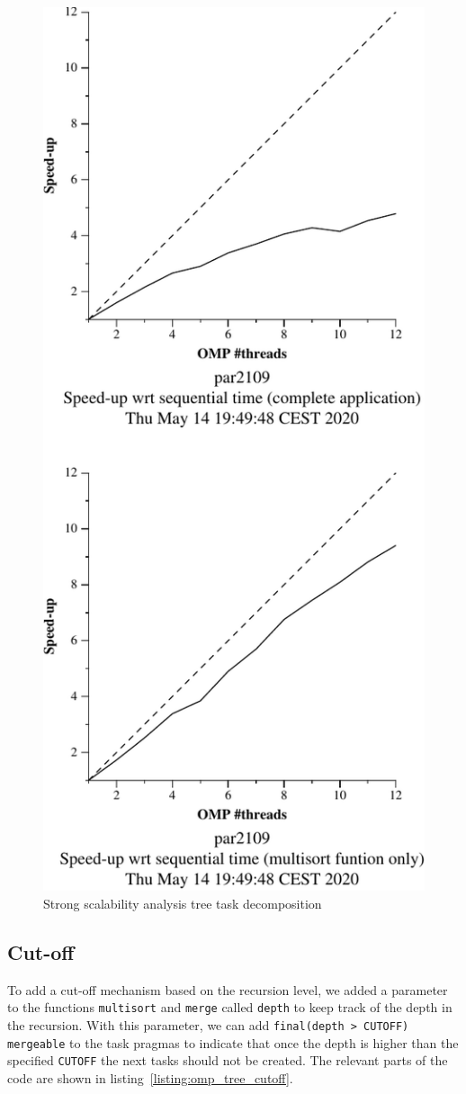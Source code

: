 \begin{figure}[H]
\begin{minipage}{0.5\textwidth}
        \includegraphics[width=0.7\linewidth]{plots/new-omp-tree-crop.pdf}
        \caption{Strong scalability analysis tree task decomposition}
        \label{fig:ssa_tree} 
    \end{minipage}
\end{figure}

\pagebreak
\subsection{Cut-off}

To add a cut-off mechanism based on the recursion level, we added a parameter to the functions
\texttt{multisort} and \texttt{merge} called \texttt{depth} to keep track of the depth in the recursion.
With this parameter, we can add \texttt{final(depth > CUTOFF) mergeable} to the task pragmas to indicate
that once the depth is higher than the specified \texttt{CUTOFF} the next tasks should not be created.
The relevant parts of the code are shown in listing~\ref{listing:omp_tree_cutoff}.

